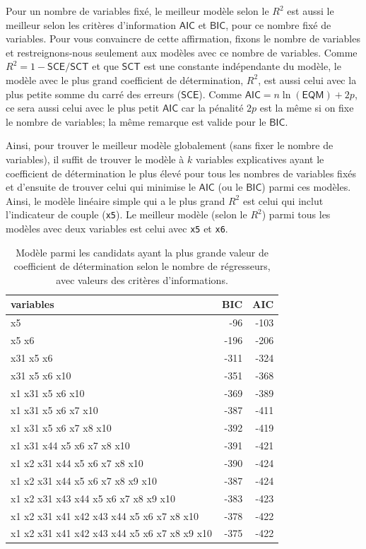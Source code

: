 \documentclass[
  11pt,
  letterpaper,
]{book}
\theoremstyle{definition}
\theoremstyle{remark}
\begin{document}
Pour un nombre de variables fixé, le meilleur modèle selon le \(R^2\)
est aussi le meilleur selon les critères d'information \(\mathsf{AIC}\)
et \(\mathsf{BIC}\), pour ce nombre fixé de variables. Pour vous
convaincre de cette affirmation, fixons le nombre de variables et
restreignons-nous seulement aux modèles avec ce nombre de variables.
Comme \(R^2=1 - \mathsf{SCE}/\mathsf{SCT}\) et que \(\mathsf{SCT}\) est
une constante indépendante du modèle, le modèle avec le plus grand
coefficient de détermination, \(R^2\), est aussi celui avec la plus
petite somme du carré des erreurs (\(\mathsf{SCE}\)). Comme
\(\mathsf{AIC}=n \ln (\mathsf{EQM}) + 2p\), ce sera aussi celui avec le
plus petit \(\mathsf{AIC}\) car la pénalité \(2p\) est la même si on
fixe le nombre de variables; la même remarque est valide pour le
\(\mathsf{BIC}\).

Ainsi, pour trouver le meilleur modèle globalement (sans fixer le nombre
de variables), il suffit de trouver le modèle à \(k\) variables
explicatives ayant le coefficient de détermination le plus élevé pour
tous les nombres de variables fixés et d'ensuite de trouver celui qui
minimise le \(\mathsf{AIC}\) (ou le \(\mathsf{BIC}\)) parmi ces modèles.
Ainsi, le modèle linéaire simple qui a le plus grand \(R^2\) est celui
qui inclut l'indicateur de couple (\texttt{x5}). Le meilleur modèle
(selon le \(R^2\)) parmi tous les modèles avec deux variables est celui
avec \texttt{x5} et \texttt{x6}.

\hypertarget{tbl-leaps-simple}{}
\begin{table}
\caption{\label{tbl-leaps-simple}Modèle parmi les candidats ayant la plus grande valeur de coefficient de
détermination selon le nombre de régresseurs, avec valeurs des critères
d'informations. }\tabularnewline

\centering
\begin{tabular}{lrr}
\toprule
variables & BIC & AIC\\
\midrule
x5 & -96 & -103\\
x5 x6 & -196 & -206\\
x31 x5 x6 & -311 & -324\\
x31 x5 x6 x10 & -351 & -368\\
x1 x31 x5 x6 x10 & -369 & -389\\
\addlinespace
x1 x31 x5 x6 x7 x10 & -387 & -411\\
x1 x31 x5 x6 x7 x8 x10 & -392 & -419\\
x1 x31 x44 x5 x6 x7 x8 x10 & -391 & -421\\
x1 x2 x31 x44 x5 x6 x7 x8 x10 & -390 & -424\\
x1 x2 x31 x44 x5 x6 x7 x8 x9 x10 & -387 & -424\\
\addlinespace
x1 x2 x31 x43 x44 x5 x6 x7 x8 x9 x10 & -383 & -423\\
x1 x2 x31 x41 x42 x43 x44 x5 x6 x7 x8 x10 & -378 & -422\\
x1 x2 x31 x41 x42 x43 x44 x5 x6 x7 x8 x9 x10 & -375 & -422\\
\bottomrule
\end{tabular}
\end{table}
\end{document}

